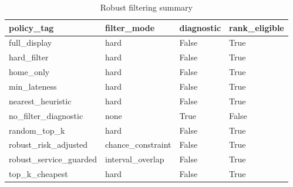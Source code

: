 \begin{table}[ht]
\centering
\begin{tabular}{llll}
 \hline
policy\_tag & filter\_mode & diagnostic & rank\_eligible \\
 \hline
full\_display & hard & False & True \\
hard\_filter & hard & False & True \\
home\_only & hard & False & True \\
min\_lateness & hard & False & True \\
nearest\_heuristic & hard & False & True \\
no\_filter\_diagnostic & none & True & False \\
random\_top\_k & hard & False & True \\
robust\_risk\_adjusted & chance\_constraint & False & True \\
robust\_service\_guarded & interval\_overlap & False & True \\
top\_k\_cheapest & hard & False & True \\
 \hline
\end{tabular}
\caption{Robust filtering summary}
\end{table}
